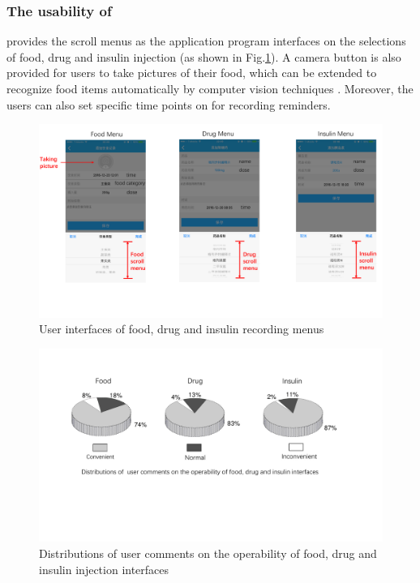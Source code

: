 {\subsubsection{The usability of \sysname}
\sysname provides the scroll menus as the application program interfaces on the selections of food, drug and insulin injection (as shown in Fig.\ref{fig:usibility_UI}). A camera button is also provided for users to take pictures of their food, which can be extended to recognize food items automatically by computer vision techniques \cite{bib:yang2010food, bib:kawano2013real}.
Moreover, the users can also set specific time points on \sysname for recording reminders.

\begin{figure}[h]
  \centering
  \includegraphics[width=0.9\columnwidth]{./img/usibility_UI.pdf}
  \caption{User interfaces of food, drug and insulin recording menus}
  \label{fig:usibility_UI}
\end{figure}

\begin{figure}[h]
  \centering
  \includegraphics[width=0.8\columnwidth]{./img/user_cases.pdf}
  \caption{Distributions of  user comments on the operability of food, drug and insulin injection interfaces}
  \label{fig:user_cases}
\end{figure}


}
